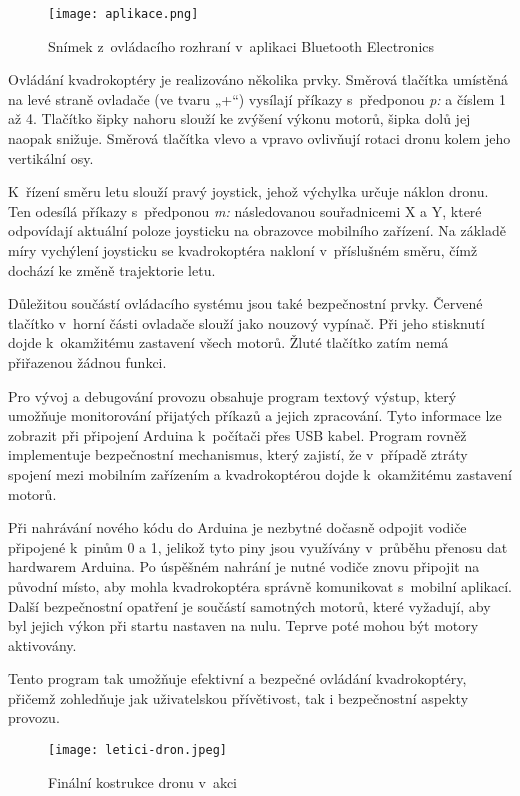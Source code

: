 \documentclass[12pt]{report}
\begin{document}
\begin{figure}[H]
	\centering
	\texttt{[image: aplikace.png]}
	\caption{Snímek z~ovládacího rozhraní v~aplikaci Bluetooth Electronics}
	\label{fig:aplikace.png}
\end{figure}

Ovládání kvadrokoptéry je realizováno několika prvky. Směrová tlačítka umístěná na levé straně ovladače (ve tvaru „+“) vysílají příkazy s~předponou \textit{p:} a číslem 1 až 4. Tlačítko šipky nahoru slouží ke zvýšení výkonu motorů, šipka dolů jej naopak snižuje. Směrová tlačítka vlevo a vpravo ovlivňují rotaci dronu kolem jeho vertikální osy.

K~řízení směru letu slouží pravý joystick, jehož výchylka určuje náklon dronu. Ten odesílá příkazy s~předponou \textit{m:} následovanou souřadnicemi X a Y, které odpovídají aktuální poloze joysticku na obrazovce mobilního zařízení. Na základě míry vychýlení joysticku se kvadrokoptéra nakloní v~příslušném směru, čímž dochází ke změně trajektorie letu.

Důležitou součástí ovládacího systému jsou také bezpečnostní prvky. Červené tlačítko v~horní části ovladače slouží jako nouzový vypínač. Při jeho stisknutí dojde k~okamžitému zastavení všech motorů. Žluté tlačítko zatím nemá přiřazenou žádnou funkci.

Pro vývoj a debugování provozu obsahuje program textový výstup, který umožňuje monitorování přijatých příkazů a jejich zpracování. Tyto informace lze zobrazit při připojení Arduina k~počítači přes USB kabel. Program rovněž implementuje bezpečnostní mechanismus, který zajistí, že v~případě ztráty spojení mezi mobilním zařízením a kvadrokoptérou dojde k~okamžitému zastavení motorů.

Při nahrávání nového kódu do Arduina je nezbytné dočasně odpojit vodiče připojené k~pinům 0 a 1, jelikož tyto piny jsou využívány v~průběhu přenosu dat hardwarem Arduina. Po úspěšném nahrání je nutné vodiče znovu připojit na původní místo, aby mohla kvadrokoptéra správně komunikovat s~mobilní aplikací. Další bezpečnostní opatření je součástí samotných motorů, které vyžadují, aby byl jejich výkon při startu nastaven na nulu. Teprve poté mohou být motory aktivovány.

Tento program tak umožňuje efektivní a bezpečné ovládání kvadrokoptéry, přičemž zohledňuje jak uživatelskou přívětivost, tak i bezpečnostní aspekty provozu.

\begin{figure}[H]
	\centering
	\texttt{[image: letici-dron.jpeg]}
	\caption{Finální kostrukce dronu v~akci}
	\label{fig:letici-dron.jpeg}
\end{figure}
\end{document}
